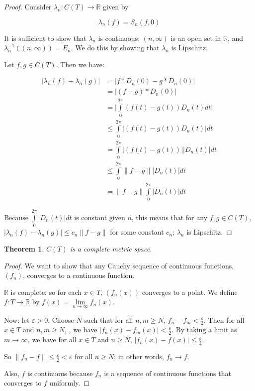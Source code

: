 \documentclass{amsart}
\newcommand{\vep}{\varepsilon}
\newcommand{\la}{\lambda}
\newcommand{\R}{\mathbb{R}}
\newcommand{\absval}[1]{\lvert #1 \rvert}
\newcommand{\norm}[1]{\|#1\|}
\newtheorem{thm}{Theorem}[section]
\theoremstyle{definition}
\begin{document}
\begin{proof}
Consider $\la_n: C(T) \to \R$ given by

\begin{displaymath}
\la_n(f) = S_n(f,0)
\end{displaymath}

It is sufficient to show that $\la_n$ is continuous; $(n, \infty)$ is an open set in $\R$, and $\la_n^{-1}((n, \infty)) = E_n$. 
We do this by showing that $\la_n$ is Lipschitz.

Let $f, g \in C(T)$. Then we have:

\begin{align*}
\absval{\la_n(f) - \la_n(g)} &= \absval{f \ast D_n(0) - g \ast D_n(0)} \\
&= \absval{(f-g) \ast D_n(0)} \\
&= \absval{\int\limits_0^{2\pi} (f(t)-g(t))D_n(t)dt} \\
&\leq \int\limits_0^{2\pi} \absval{(f(t)-g(t))D_n(t)}dt \\
&= \int\limits_0^{2\pi} \absval{(f(t)-g(t))}\absval{D_n(t)}dt \\
&\leq \int\limits_0^{2\pi} \norm{f-g}\absval{D_n(t)}dt \\
&= \norm{f-g} \int\limits_0^{2\pi} \absval{D_n(t)}dt
\end{align*}

Because $\int\limits_0^{2\pi} \absval{D_n(t)}dt$ is constant given $n$, this means that for any $f,g \in C(T)$, $\absval{\la_n(f) - \la_n(g)} \leq c_n \norm{f-g}$ for some constant $c_n$; $\la_n$ is Lipschitz.

\end{proof}

\begin{thm}
$C(T)$ is a complete metric space.
\end{thm}

\begin{proof}
We want to show that any Cauchy sequence of continuous functions, $(f_n)$, converges to a continuous function.

$\R$ is complete: so for each $x \in T$, $(f_n(x))$ converges to a point. We define $f: T \to \R$ by $f(x) = \lim\limits_{n \to \infty} f_n(x)$.

Now: let $\vep >0$. Choose $N$ such that for all $n,m \geq N$, ${f_n-f_m} < \frac{\vep}{2}$. 
Then for all $x \in T$ and $n,m \geq N$, , we have $\absval{f_n(x) - f_m(x)} < \frac{\vep}{2}$.
By taking a limit as $m \to \infty$, we have for all $x \in T$ and $n \geq N$, $\absval{f_n(x) - f(x)} \leq \frac{\vep}{2}$.

So $\norm{f_n - f} \leq \frac{\vep}{2} < \vep$ for all $n \geq N$; in other words, $f_n \to f$.

Also, $f$ is continuous because $f_n$ is a sequence of continuous functions that converges to $f$ uniformly.

\end{proof}
\end{document}
